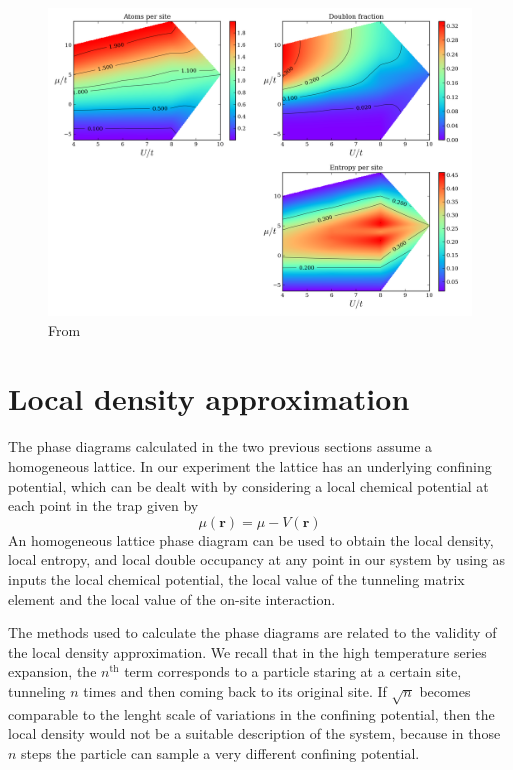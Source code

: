 \documentclass[11pt,letter]{article}
\newcommand{\bv}[1]{\ensuremath{\bm{#1}}}
\begin{document}
\begin{figure}
\centering \includegraphics[width=\textwidth]{../HighT_figures/FUCHS_phasesT=3.png}
\caption[Low temperature phase diagram of the Fermi-Hubbard model]{\small
From~\cite{Fuchs2011}} \label{fig:fuchs10}
\end{figure}


\section{ Local density approximation }



The phase diagrams calculated in the two previous sections assume a homogeneous
lattice.  In our experiment the lattice has an underlying confining potential,
which can be dealt with by considering a local chemical potential at each point
in the trap given by
\begin{equation}
 \mu(\bv{r}) = \mu - V(\bv{r}) 
\end{equation}
An homogeneous lattice phase diagram can be used to obtain the local density,
local entropy, and local double occupancy at any point in our system by using
as inputs the local chemical potential,  the local value of the tunneling
matrix element and the local value of the on-site interaction.  

The methods used to calculate the phase diagrams are related to the validity of
the local density approximation.   We recall that in the high temperature
series expansion, the $n^{\text{th}}$  term corresponds to a particle staring
at a certain site, tunneling $n$ times and then coming back to its original
site.  If $\sqrt{n}$ becomes comparable to the lenght scale of variations in
the confining potential, then the local density would not be a suitable
description of the system, because in those $n$ steps the particle can sample a
very different confining potential.  
\end{document}
